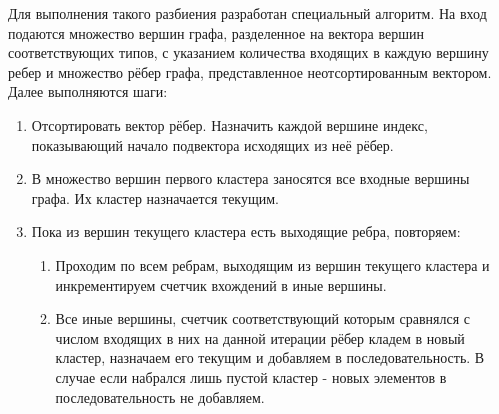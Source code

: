 Для выполнения такого разбиения разработан специальный алгоритм. На вход подаются
множество вершин графа, разделенное на вектора вершин соответствующих типов, с указанием количества входящих в каждую
вершину ребер и множество рёбер графа, представленное неотсортированным вектором.
Далее выполняются шаги:
\begin{enumerate}
    \item Отсортировать вектор рёбер. Назначить каждой вершине индекс, показывающий начало подвектора исходящих из неё рёбер.
    \item В множество вершин первого кластера заносятся все входные вершины графа. Их кластер назначается текущим.
    \item Пока из вершин текущего кластера есть выходящие ребра, повторяем:
    \begin{enumerate}
        \item Проходим по всем ребрам, выходящим из вершин текущего кластера и инкрементируем счетчик вхождений в иные вершины.
        \item Все иные вершины, счетчик соответствующий которым сравнялся с числом входящих в них на данной итерации рёбер кладем в новый кластер, назначаем его текущим и добавляем в последовательность. В случае если набрался лишь пустой кластер - новых элементов в последовательность не добавляем.
    \end{enumerate}
\end{enumerate}
